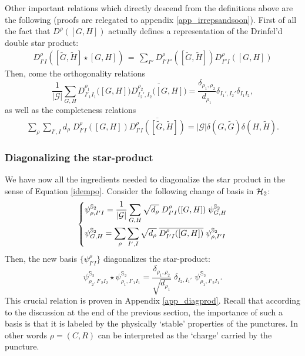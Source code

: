 \documentclass[nofootinbib,superscriptaddress,eqsecnum,tightenlines,11pt]{revtex4-1}
\def\wG{\widetilde{G}}
\def\wH{\widetilde{H}}
\def\mG{\mathcal{G}}
\def\be{\begin{equation}}
\def\ee{\end{equation}}
\renewcommand{\S}{{\mathbb S}}
\begin{document}
Other important relations which directly descend from the definitions above are the following (proofs are relegated to appendix \ref{app_irrepsandsoon}). 
First of all the fact that $D^{\rho}([G,H])$ actually defines a representation of the Drinfel'd double star product:
\begin{align} 
	D^{\rho}_{I' I}([\widetilde{G},\widetilde{H}]\star [G,H]) \, = \,\sum_{I''} D^{\rho}_{I' I''}([\wG,\wH])D^{\rho}_{I'' I}([G,H])
		\label{defining}
\end{align}
Then, come the orthogonality relations
\be
	\frac{1}{|\mathcal{G}|}\sum_{G,H }D^{\rho_1}_{I'_1 I_1}\big( [G,H]\big)\overline{D^{\rho_2}_{I_2',I_2}\big( [G,H]\big)}
	= \frac{\delta_{\rho_1,\rho_2}}{d_{\rho_1}}\delta_{I_1',I_2'}\delta_{I_1I_2},
	\label{orthoMat}
\ee
as well as the completeness relations
\begin{align}
	\sum_{\rho}\sum_{I',I} d_{\rho}\; D^{\rho}_{I' I}([G,H])\overline{D^{\rho}_{I' I}([\widetilde{G},\widetilde{H}])}
	 = |\mathcal{G}| \delta(G,\widetilde{G})\delta(H,\widetilde{H}) .
 	 \label{completeness}
\end{align}



\subsubsection{Diagonalizing the star-product}

We have now all the ingredients needed to diagonalize the star product in the sense of Equation \eqref{idempo}.
Consider the following change of basis in ${\cal H}_2$:
\begin{align}
\begin{dcases}
 \psi^{\S_2}_{\rho,I'I}  = \frac{1}{|\mG|} \sum_{G,H} \sqrt{d_\rho}\;D^\rho_{I'I}([G,H]) \; \psi^{\S_2}_{G,H}  \\
 \psi^{\S_2}_{G,H} =  \sum_{\rho}\sum_{I',I} \sqrt{d_\rho}\;  \overline{D^\rho_{I'I}([G,H])} \;  \psi^{\S_2}_{\rho,I'I}
\end{dcases}
\end{align}
Then, the new basis $\{ \psi^{\rho}_{I'I} \}$ diagonalizes the star-product: 
\be
 \psi^{\S_2}_{\rho_2,I'_2 I_2} \star  \psi^{\S_2}_{\rho_1,I'_1 I_1 } = \frac{\delta_{\rho_1,\rho_2}}{\sqrt{d_{\rho_1}}}\; \delta_{I_2 , I_1'}\;  \psi^{\S_2}_{\rho_1,I'_2I_1}.
 \label{comultrivia}
\ee
This crucial relation is proven in Appendix \ref{app_diagprod}.
Recall that according to the discussion at the end of the previous section, the importance of such a basis is that it is labeled by the physically `stable' properties of the punctures. 
In other words $\rho=(C,R)$ can be interpreted as the `charge' carried by the puncture.
\end{document}
